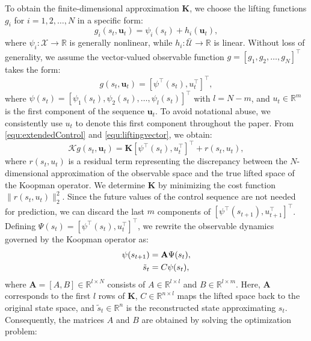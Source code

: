 \documentclass[pdflatex,sn-mathphys,Numbered]{sn-jnl}
\numberwithin{equation}{section}
\begin{document}
To obtain the finite-dimensional approximation $\mathbf{K}$, we choose the lifting functions $g_i$ for $i = 1, 2, \ldots, N$ in a specific form:
\begin{equation}
g_i(s_t, \mathbf{u}_t) = \psi_i(s_t) + h_i(\mathbf{u}_t), \label{equ:lifting}
\end{equation}
where $\psi_i: \mathcal{X} \to \mathbb{R}$ is generally nonlinear, while $h_i: \bar{\mathcal{U}} \to \mathbb{R}$ is linear. Without loss of generality, we assume the vector-valued observable function $g = [g_1, g_2, \ldots, g_N]^\top$ takes the form:
\begin{equation}
g(s_t, \mathbf{u}_t) = [\psi^\top(s_t), u_t^\top]^\top, \label{equ:liftingvector}
\end{equation}
where $\psi(s_t) = [\psi_1(s_t), \psi_2(s_t), \ldots, \psi_l(s_t)]^\top$ with $l = N - m$, and $u_t \in \mathbb{R}^m$ is the first component of the sequence $\mathbf{u}_t$. To avoid notational abuse, we consistently use $u_t$ to denote this first component throughout the paper. From \eqref{equ:extendedControl} and \eqref{equ:liftingvector}, we obtain:
\begin{equation}
\mathcal{K} g(s_t, \mathbf{u}_t) = \mathbf{K} [\psi^\top(s_t), u_t^\top]^\top + r(s_t, u_t), \label{equ:EDMD}
\end{equation}
where $r(s_t, u_t)$ is a residual term representing the discrepancy between the $N$-dimensional approximation of the observable space and the true lifted space of the Koopman operator. We determine $\mathbf{K}$ by minimizing the cost function $\| r(s_t, u_t) \|_2^2$. Since the future values of the control sequence are not needed for prediction, we can discard the last $m$ components of $[\psi^\top(s_{t+1}), u_{t+1}^\top]^\top$. Defining $\Psi(s_t) = [\psi^\top(s_t), u_t^\top]^\top$, we rewrite the observable dynamics governed by the Koopman operator as:
\begin{align}
\psi(s_{t+1}) &= \mathbf{A} \Psi(s_t), \notag \\
\tilde{s}_t &= C \psi(s_t), \label{equ:KoopmanOpertor}
\end{align}
where $\mathbf{A} = [A, B] \in \mathbb{R}^{l \times N}$ consists of $A \in \mathbb{R}^{l \times l}$ and $B \in \mathbb{R}^{l \times m}$. Here, $\mathbf{A}$ corresponds to the first $l$ rows of $\mathbf{K}$, $C \in \mathbb{R}^{n \times l}$ maps the lifted space back to the original state space, and $\tilde{s}_t \in \mathbb{R}^n$ is the reconstructed state approximating $s_t$. Consequently, the matrices $A$ and $B$ are obtained by solving the optimization problem:
\end{document}
